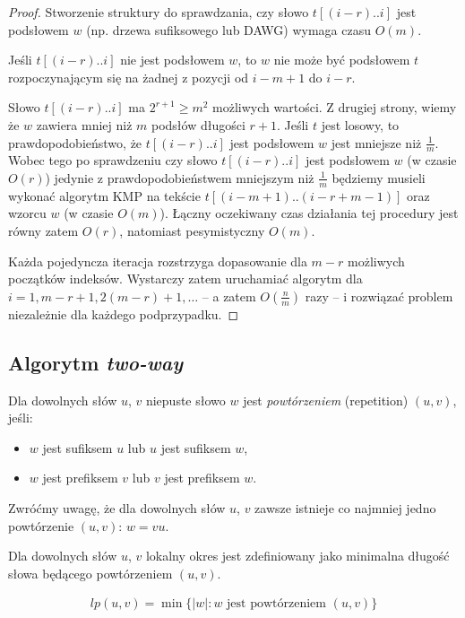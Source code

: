 \begin{proof}
  Stworzenie struktury do sprawdzania, czy słowo $t[(i - r)..i]$ jest podsłowem $w$ (np. drzewa sufiksowego lub DAWG) wymaga czasu $O(m)$.
  
  Jeśli $t[(i - r)..i]$ nie jest podsłowem $w$, to $w$ nie może być podsłowem $t$ rozpoczynającym się na żadnej z pozycji od $i - m + 1$ do $i - r$.
  
  Słowo $t[(i - r)..i]$ ma $2^{r + 1} \ge m^2$ możliwych wartości. Z drugiej strony, wiemy że $w$ zawiera mniej niż $m$ podsłów długości $r + 1$.
  Jeśli $t$ jest losowy, to prawdopodobieństwo, że $t[(i - r)..i]$ jest podsłowem $w$ jest mniejsze niż $\frac{1}{m}$.
  Wobec tego po sprawdzeniu czy słowo $t[(i - r)..i]$ jest podsłowem $w$ (w czasie $O(r)$) jedynie z prawdopodobieństwem mniejszym niż $\frac{1}{m}$ będziemy musieli wykonać algorytm KMP na tekście $t[(i - m + 1)..(i - r + m - 1)]$ oraz wzorcu $w$ (w czasie $O(m)$). Łączny oczekiwany czas działania tej procedury jest równy zatem $O(r)$, natomiast pesymistyczny $O(m)$.
  
  Każda pojedyncza iteracja rozstrzyga dopasowanie dla $m - r$ możliwych początków indeksów. Wystarczy zatem uruchamiać algorytm dla $i = 1, m - r + 1, 2 (m - r) + 1, \ldots$ -- a zatem $O\left(\frac{n}{m}\right)$ razy -- i rozwiązać problem niezależnie dla każdego podprzypadku.
\end{proof}

\subsection{Algorytm \emph{two-way}}

\begin{definition}{}{}
  Dla dowolnych słów $u$, $v$ niepuste słowo $w$ jest \emph{powtórzeniem} (repetition) $(u, v)$, jeśli:
  \begin{itemize}
    \item $w$ jest sufiksem $u$ lub $u$ jest sufiksem $w$,
    \item $w$ jest prefiksem $v$ lub $v$ jest prefiksem $w$.
  \end{itemize}
\end{definition}
Zwróćmy uwagę, że dla dowolnych słów $u$, $v$ zawsze istnieje co najmniej jedno powtórzenie $(u, v)$: $w = vu$.

\begin{definition}{}{}
  Dla dowolnych słów $u$, $v$ lokalny okres jest zdefiniowany jako minimalna długość słowa będącego powtórzeniem $(u, v)$.

  \begin{align*}
    lp(u, v) = \min\{|w|: \text{$w$ jest powtórzeniem $(u, v)$}\}
  \end{align*}
\end{definition}


